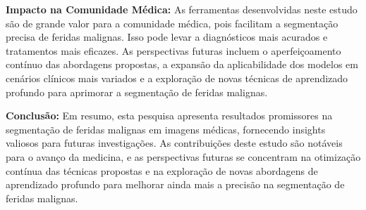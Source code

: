    \textbf{Impacto na Comunidade Médica:} As ferramentas desenvolvidas neste estudo são de grande valor para a comunidade médica, pois facilitam a segmentação precisa de feridas malignas. Isso pode levar a diagnósticos mais acurados e tratamentos mais eficazes. As perspectivas futuras incluem o aperfeiçoamento contínuo das abordagens propostas, a expansão da aplicabilidade dos modelos em cenários clínicos mais variados e a exploração de novas técnicas de aprendizado profundo para aprimorar a segmentação de feridas malignas.

    \textbf{Conclusão:} Em resumo, esta pesquisa apresenta resultados promissores na segmentação de feridas malignas em imagens médicas, fornecendo insights valiosos para futuras investigações. As contribuições deste estudo são notáveis para o avanço da medicina, e as perspectivas futuras se concentram na otimização contínua das técnicas propostas e na exploração de novas abordagens de aprendizado profundo para melhorar ainda mais a precisão na segmentação de feridas malignas.